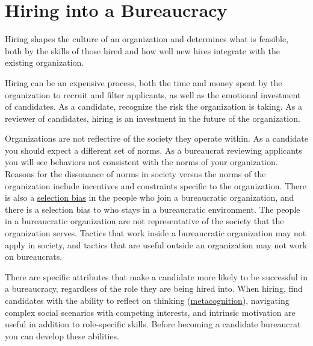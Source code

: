 



\section{Hiring into a Bureaucracy\label{sec:hiring}}


Hiring shapes the culture of an organization and determines what is feasible, both by the skills of those hired and how well new hires integrate with the existing organization. 

Hiring can be an expensive process, both the time and money spent by the organization to recruit and filter applicants, as well as the emotional investment of candidates. %
As a candidate, recognize the risk the organization is taking. 
As a reviewer of candidates, hiring is an investment in the future of the organization. %

Organizations are not reflective of the society they operate within. As a candidate you should expect a different set of norms. As a bureaucrat reviewing applicants you will see behaviors not consistent with the norms of your organization. 
Reasons for the dissonance of norms in society versus the norms of the organization include incentives and constraints specific to the organization. 
There is also a \href{https://en.wikipedia.org/wiki/Selection_bias}{selection bias} in
the people who join a bureaucratic organization, and there is a selection bias to who stays in a bureaucratic environment. 
The people in a bureaucratic organization are not representative of the society that the organization serves. Tactics that work inside a bureaucratic organization may not apply in society, and tactics that are useful outside an organization may not work on bureaucrats. 



There are specific attributes that make a candidate more likely to be successful in a bureaucracy, regardless of the role they are being hired into. When hiring, find candidates with the ability to reflect on thinking (\href{https://en.wikipedia.org/wiki/Metacognition}{metacognition}),
\iftoggle{WPinmargin}{\marginpar{$>$Wikipedia: Metacognition}}{}
navigating complex social scenarios with competing interests, and intrinsic motivation are useful in addition to role-specific skills. Before becoming a candidate bureaucrat you can develop these abilities. 




